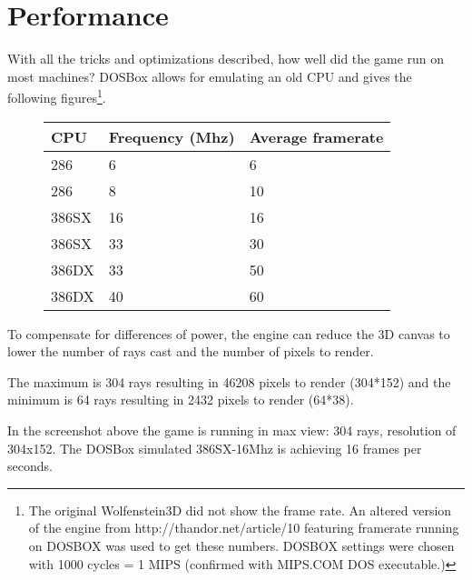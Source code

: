 \section{Performance}
With all the tricks and optimizations described, how well did the game run on most machines? DOSBox allows for emulating an old CPU and gives the following figures\footnote{The original Wolfenstein3D did not show the frame rate. An altered version of the engine from http://thandor.net/article/10 featuring framerate running on DOSBOX was used to get these numbers. DOSBOX settings were chosen with 1000 cycles = 1 MIPS (confirmed with MIPS.COM DOS executable.)}.

\begin{figure}[H]
\centering
\begin{tabularx}{\textwidth}{ X X X }
  \toprule
  \textbf{CPU} & \textbf{Frequency (Mhz)} & \textbf{Average framerate} \\ \bottomrule
 286 & 6 & 6 \\
 286 & 8 & 10 \\
 386SX & 16 &  16 \\
 386SX & 33 & 30 \\
 386DX & 33 & 50 \\
 386DX & 40 & 60 \\ \bottomrule
\end{tabularx}
\end{figure}

To compensate for differences of power, the engine can reduce the 3D canvas to lower the number of rays cast and the number of pixels to render.\\
\par
The maximum is 304 rays resulting in 46208 pixels to render (304*152) and the minimum is 64 rays resulting in 2432 pixels to render (64*38).\\

  \begin{figure}[H]
\centering
 \end{figure}
 \par
 In the screenshot above the game is running in max view: 304 rays, resolution of 304x152. The DOSBox simulated 386SX-16Mhz is achieving 16 frames per seconds.

   \begin{figure}[H]
\centering
 \end{figure}
 \par

